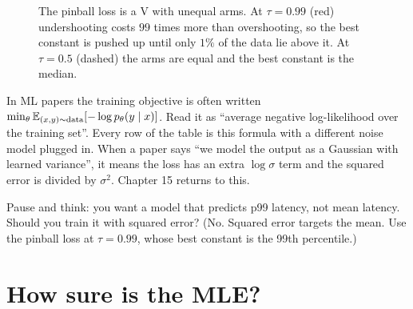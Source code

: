 \begin{figure}[H]
\centering
{}
\caption{The pinball loss is a V with unequal arms. At $\tau=0.99$ (red) undershooting costs
$99$ times more than overshooting, so the best constant is pushed up until only $1\%$ of
the data lie above it. At $\tau=0.5$ (dashed) the arms are equal and the best constant is
the median.}
\label{fig:lik-pinball}
\end{figure}

\begin{connectionbox}
In ML papers the training objective is often written
$\min_\theta \operatorname{\mathbb{E}}_{(x,y)\sim\text{data}}[-\log p_\theta(y\mid x)]$. Read it as ``average
negative log-likelihood over the training set''. Every row of the table is this formula
with a different noise model plugged in. When a paper says ``we model the output as a
Gaussian with learned variance'', it means the loss has an extra $\log\sigma$ term and
the squared error is divided by $\sigma^2$. Chapter 15 returns to this.
\end{connectionbox}

\begin{recoverybox}
Pause and think: you want a model that predicts p99 latency, not mean latency. Should you
train it with squared error? (No. Squared error targets the mean. Use the pinball loss
at $\tau = 0.99$, whose best constant is the 99th percentile.)
\end{recoverybox}

\section{How sure is the MLE?}
\label{sec:lik-fisher}

